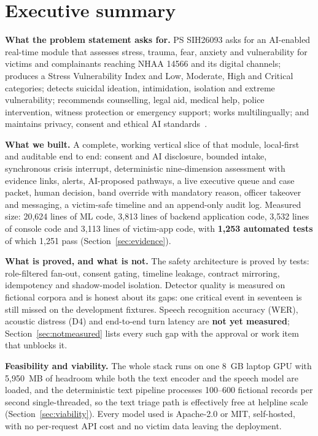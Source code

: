 \documentclass[11pt,a4paper]{article}
\begin{document}
\tableofcontents
\newpage
{}

\section{Executive summary}

\textbf{What the problem statement asks for.} PS SIH26093 asks for an AI-enabled real-time module
that assesses stress, trauma, fear, anxiety and vulnerability for victims and complainants reaching
NHAA 14566 and its digital channels; produces a Stress Vulnerability Index and Low, Moderate, High
and Critical categories; detects suicidal ideation, intimidation, isolation and extreme
vulnerability; recommends counselling, legal aid, medical help, police intervention, witness
protection or emergency support; works multilingually; and maintains privacy, consent and ethical AI
standards~\cite{sih26093}.

\textbf{What we built.} A complete, working vertical slice of that module, local-first and
auditable end to end: consent and AI disclosure, bounded intake, synchronous crisis interrupt,
deterministic nine-dimension assessment with evidence links, alerts, AI-proposed pathways, a live
executive queue and case packet, human decision, band override with mandatory reason, officer
takeover and messaging, a victim-safe timeline and an append-only audit log. Measured size:
20{,}624 lines of ML code, 3{,}813 lines of backend application code, 3{,}532 lines of console code
and 3{,}113 lines of victim-app code, with \textbf{1{,}253 automated tests} of which 1{,}251 pass
(Section~\ref{sec:evidence}).

\textbf{What is proved, and what is not.} The safety architecture is proved by tests: role-filtered
fan-out, consent gating, timeline leakage, contract mirroring, idempotency and shadow-model
isolation. Detector quality is measured on fictional corpora and is honest about its gaps: one
critical event in seventeen is still missed on the development fixtures. Speech recognition accuracy
(WER), acoustic distress (D4) and end-to-end turn latency are \textbf{not yet measured};
Section~\ref{sec:notmeasured} lists every such gap with the approval or work item that unblocks it.

\textbf{Feasibility and viability.} The whole stack runs on one 8~GB laptop GPU with 5{,}950~MB of
headroom while both the text encoder and the speech model are loaded, and the deterministic text
pipeline processes 100--600 fictional records per second single-threaded, so the text triage path is
effectively free at helpline scale (Section~\ref{sec:viability}). Every model used is Apache-2.0 or
MIT, self-hosted, with no per-request API cost and no victim data leaving the deployment.
\end{document}
